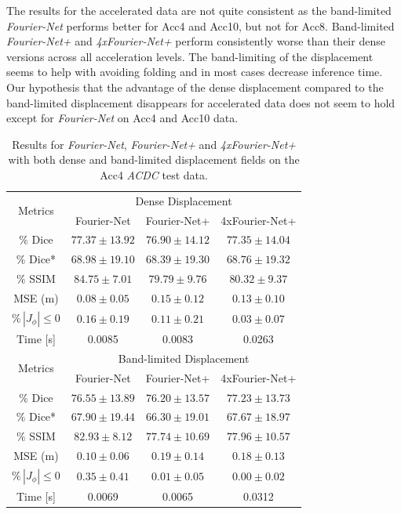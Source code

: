 \documentclass[english,version-2022-01]{uzl-thesis} %
\begin{document}
The results for the accelerated data are not quite consistent as the band-limited \emph{Fourier-Net} performs better for Acc4 and Acc10, but not for Acc8. Band-limited \emph{Fourier-Net+} and \emph{4xFourier-Net+} perform consistently worse than their dense versions across all acceleration levels. The band-limiting of the displacement seems to help with avoiding folding and in most cases decrease inference time. Our hypothesis that the advantage of the dense displacement compared to the band-limited displacement disappears for accelerated data does not seem to hold except for \emph{Fourier-Net} on Acc4 and Acc10 data.


\begin{table}[h] %
	\centering
	\caption{Results for \emph{Fourier-Net}, \emph{Fourier-Net+} and \emph{4xFourier-Net+} with both dense and band-limited displacement fields on the Acc4 \emph{ACDC} test data.}
	\label{tab:DenseDisplacementAcc4}
	\begin{tabular}{c c c c} %
		\toprule
		\multirow{2}{*}{Metrics} & \multicolumn{3}{c}{Dense Displacement} \\
		\cline{2-4} 
		 & Fourier-Net & Fourier-Net+ & 4xFourier-Net+\\	
		\midrule
		$\%$ Dice & $77.37 \pm 13.92$ & $76.90 \pm 14.12$ & $77.35 \pm 14.04$\\
		$\%$ Dice* & $68.98 \pm 19.10$ & $68.39 \pm 19.30$ & $68.76 \pm 19.32$ \\
		$\%$ SSIM & $84.75 \pm 7.01$ & $79.79 \pm 9.76$ & $80.32 \pm 9.37$\\
		MSE (m) & $0.08 \pm 0.05$ & $0.15 \pm 0.12$ & $0.13 \pm 0.10$ \\
		$\% \, |J_{\phi}|\leq0$ & $0.16 \pm 0.19$ & $0.11 \pm 0.21$ & $0.03 \pm 0.07$ \\
		Time [s] 	  & 0.0085 & 0.0083 & 0.0263  \\
		\midrule
		\multirow{2}{*}{Metrics} & \multicolumn{3}{c}{Band-limited Displacement} \\
		\cline{2-4} 
		 & Fourier-Net & Fourier-Net+ & 4xFourier-Net+\\		
		\midrule
		$\%$ Dice & $76.55 \pm 13.89$ & $76.20 \pm 13.57$ & $77.23 \pm 13.73$\\
		$\%$ Dice* & $67.90 \pm 19.44$ & $66.30 \pm 19.01$ & $67.67 \pm 18.97$ \\
		$\%$ SSIM & $82.93 \pm 8.12$ & $77.74 \pm 10.69$ & $77.96 \pm 10.57$\\
		MSE (m) & $0.10 \pm 0.06$ & $0.19 \pm 0.14$ & $0.18 \pm 0.13$ \\
		$\% \, |J_{\phi}|\leq0$ & $0.35 \pm 0.41$ & $0.01 \pm 0.05$ & $0.00 \pm 0.02$ \\
		Time [s] 	  & 0.0069  	& 0.0065 	& 0.0312  \\
		\bottomrule
	\end{tabular}	
\end{table}
\end{document}

